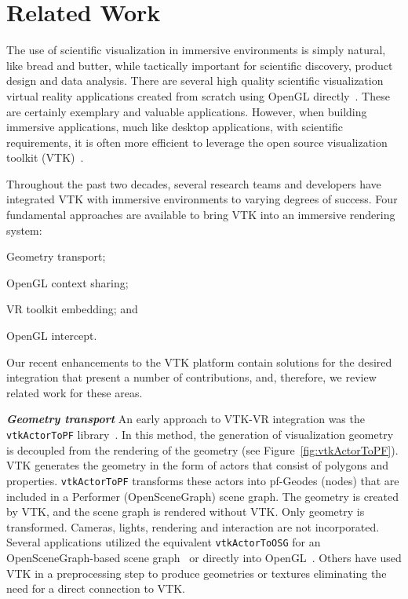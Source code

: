 \section{Related Work}

The use of scientific visualization in immersive environments is simply natural, like bread and butter, while tactically important for scientific discovery, product design and data analysis.
There are several high quality scientific visualization virtual reality applications created from scratch using OpenGL directly~\cite{Billen:2008, LaViola:2007, Schulze:2001, Rantzau:1998}.
These are certainly exemplary and valuable applications.
However, when building immersive applications, much like desktop applications, with scientific requirements, it is often more efficient to leverage the open source visualization toolkit (VTK)~\cite{Schroeder:2004}.

Throughout the past two decades, several research teams and developers have integrated VTK with immersive environments to varying degrees of success.
Four fundamental approaches are available to bring VTK into an
immersive rendering system:

\begin{compactitem}
\item Geometry transport;
\item OpenGL context sharing;
\item VR toolkit embedding; and
\item OpenGL intercept.

\end{compactitem}

Our recent enhancements to the VTK platform contain solutions for the desired integration that present a number of contributions, and, therefore, we review related work for these areas.

\textbf{\textit{Geometry transport}}
An early approach to VTK-VR integration was the \texttt{vtkActorToPF} library~\cite{Leigh98limbo/vtk}.
In this method, the generation of visualization geometry is decoupled from
the rendering of the geometry (see Figure~\ref{fig:vtkActorToPF}). 
VTK generates the geometry in the form of actors that consist of polygons and properties.
\texttt{vtkActorToPF} transforms these actors into pf-Geodes (nodes) that are included in a Performer (OpenSceneGraph) scene graph. The geometry is created by VTK, and the scene graph is rendered without VTK. Only geometry is transformed. Cameras, lights, rendering and interaction are not incorporated. Several applications utilized the equivalent \texttt{vtkActorToOSG} for an OpenSceneGraph-based scene graph~\cite{VE-Suite:2016} or directly into OpenGL~\cite{Ohno:2006}. Others have used VTK in a preprocessing step to produce geometries or textures eliminating the need for a direct connection to VTK\cite{Bivins:2005}.

